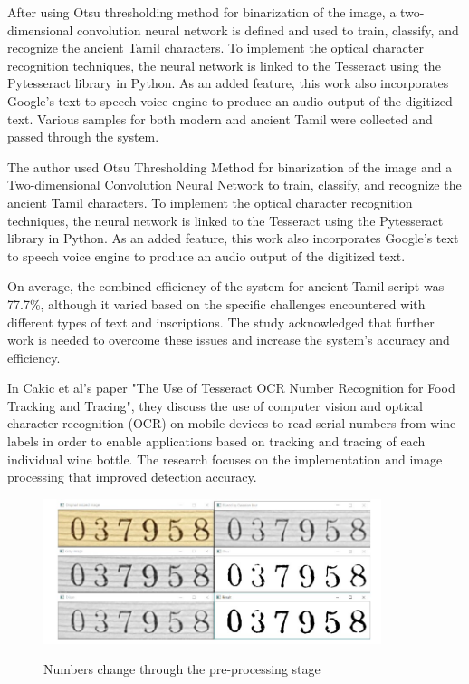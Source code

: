 After using Otsu thresholding method for binarization of the image, a two-dimensional convolution neural network is defined and used to train, classify, and recognize the ancient Tamil characters. To implement the optical character recognition techniques, the neural network is linked to the Tesseract using the Pytesseract library in Python. As an added feature, this work also incorporates Google's text to speech voice engine to produce an audio output of the digitized text. Various samples for both modern and ancient Tamil were collected and passed through the system.


The author used Otsu Thresholding Method for binarization of the image and a Two-dimensional Convolution Neural Network to train, classify, and recognize the ancient Tamil characters. To implement the optical character recognition techniques, the neural network is linked to the Tesseract using the Pytesseract library in Python. As an added feature, this work also incorporates Google's text to speech voice engine to produce an audio output of the digitized text.

On average, the combined efficiency of the system for ancient Tamil script was 77.7\%, although it varied based on the specific challenges encountered with different types of text and inscriptions. The study acknowledged that further work is needed to overcome these issues and increase the system's accuracy and efficiency.\cite{giridharNovelApproachOCR2019}

In Cakic et al's paper "The Use of Tesseract OCR Number Recognition for Food Tracking and Tracing", they discuss the use of computer vision and optical character recognition (OCR) on mobile devices to read serial numbers from wine labels in order to enable applications based on tracking and tracing of each individual wine bottle. The research focuses on the implementation and image processing that improved detection accuracy.

\begin{figure}[ht]
    \centering
    \includegraphics[width=0.88\textwidth]{Figures/tesseract_papers/Cakic_2020.jpg}
    \caption[Numbers change through the pre-processing stage]{Numbers change through the pre-processing stage}\cite{cakicUseTesseractOCR2020}
    \label{fig:Cakic's Numbers change through the preprocessing stage}
\end{figure}

